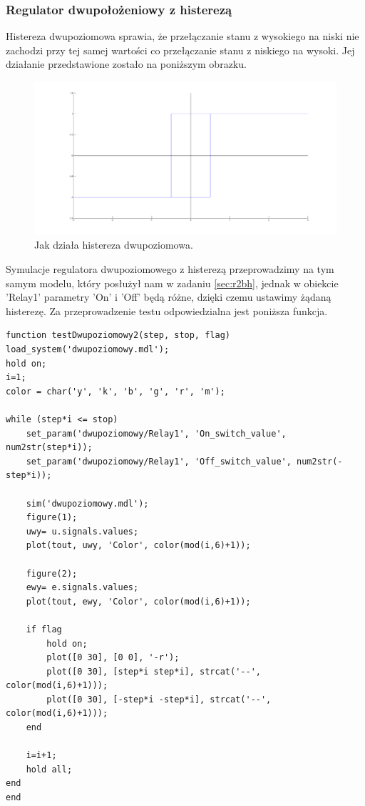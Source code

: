 \documentclass[a4paper,10pt]{article}
\begin{document}
\subsubsection{Regulator dwupołożeniowy z histerezą}\label{sec:r2h}%

Histereza dwupoziomowa sprawia, że przełączanie stanu z wysokiego na niski nie zachodzi przy tej samej wartości co przełączanie stanu z niskiego na wysoki. Jej działanie przedstawione zostało na poniższym obrazku.

\begin{figure}[!h]
    \centering
	\includegraphics[width=120mm]{CW3-histereza-dwupoziomowa.png}
	\caption{Jak działa histereza dwupoziomowa.}
    \label{fig:Rysunek}
\end{figure}

Symulacje regulatora dwupoziomowego z histerezą przeprowadzimy na tym samym modelu, który posłużył nam w zadaniu \ref{sec:r2bh}, jednak w obiekcie 'Relay1' parametry 'On' i 'Off' będą różne, dzięki czemu ustawimy żądaną histerezę.\newpage
Za przeprowadzenie testu odpowiedzialna jest poniższa funkcja.

\begin{lstlisting}[caption=Funkcja testująca regulator dwupołożeniowy z histerezą.]
function testDwupoziomowy2(step, stop, flag)
load_system('dwupoziomowy.mdl');
hold on;
i=1;
color = char('y', 'k', 'b', 'g', 'r', 'm');

while (step*i <= stop)
    set_param('dwupoziomowy/Relay1', 'On_switch_value', num2str(step*i));
    set_param('dwupoziomowy/Relay1', 'Off_switch_value', num2str(-step*i));

    sim('dwupoziomowy.mdl');
    figure(1);
    uwy= u.signals.values;    
    plot(tout, uwy, 'Color', color(mod(i,6)+1));

    figure(2);
    ewy= e.signals.values;    
    plot(tout, ewy, 'Color', color(mod(i,6)+1));

    if flag
        hold on;
        plot([0 30], [0 0], '-r');
        plot([0 30], [step*i step*i], strcat('--', color(mod(i,6)+1)));
        plot([0 30], [-step*i -step*i], strcat('--', color(mod(i,6)+1)));
    end

    i=i+1;
    hold all;
end
end
\end{lstlisting}
\end{document}
